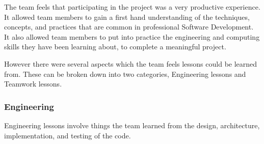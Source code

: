 \documentclass[11pt]{article}
\begin{document}
The team feels that participating in the project was a very productive experience. It allowed team members to gain a first hand understanding of the techniques, concepts, and practices that are common in professional Software Development. It also allowed team members to put into practice the engineering and computing skills they have been learning about, to complete a meaningful project. 

However there were several aspects which the team feels lessons could be learned from.
These can be broken down into two categories, Engineering lessons and Teamwork lessons.

\subsubsection{Engineering}

Engineering lessons involve things the team learned from the design, architecture, implementation, and testing of the code.
\end{document}
